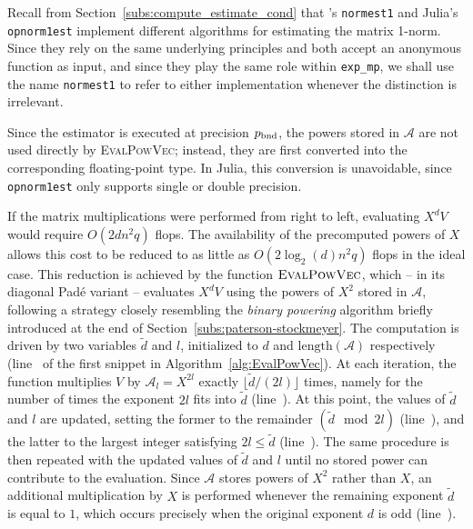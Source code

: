 \begin{oss*}
	Recall from Section~\ref{subs:compute_estimate_cond} that \matlab{}'s \texttt{normest1} and Julia's \texttt{opnorm1est} implement different algorithms for estimating the matrix 1-norm. Since they rely on the same underlying principles and both accept an anonymous function as input, and since they play the same role within \texttt{exp\_mp}, we shall use the name \texttt{normest1} to refer to either implementation whenever the distinction is irrelevant.
	
	Since the estimator is executed at precision $p_{\textup{bnd}}$, the powers stored in $\mathcal{A}$ are not used directly by \textsc{EvalPowVec}; instead, they are first converted into the corresponding floating-point type. In Julia, this conversion is unavoidable, since \texttt{opnorm1est} only supports single or double precision. 
\end{oss*}

If the matrix multiplications were performed from right to left, evaluating $X^{d}V$ would require $O(2dn^{2}q)$ flops. The availability of the precomputed powers of $X$ allows this cost to be reduced to as little as $O(2\log_2(d)n^{2}q)$ flops in the ideal case. This reduction is achieved by the function $\textsc{EvalPowVec}$, which -- in its diagonal Padé variant -- evaluates $X^{d}V$ using the powers of $X^2$ stored in $\mathcal{A}$, following a strategy closely resembling the \emph{binary powering} algorithm briefly introduced at the end of Section~\ref{subs:paterson-stockmeyer}.
The computation is driven by two variables $\tilde{d}$ and $l$, initialized to $d$ and $\text{length}(\mathcal{A})$ respectively (line~ of the first snippet in Algorithm~\ref{alg:EvalPowVec}). At each iteration, the function multiplies $V$ by $\mathcal{A}_{l}=X^{2l}$ exactly $\lfloor\tilde{d}/(2l)\rfloor$ times, namely for the number of times the exponent $2l$ fits into $\tilde{d}$ (line~). At this point, the values of $\tilde{d}$ and $l$ are updated, setting the former to the remainder $(\tilde{d}\mod{2l})$ (line~), and the latter to the largest integer satisfying $2l\le\tilde{d}$ (line~). The same procedure is then repeated with the updated values of $\tilde{d}$ and $l$ until no stored power can contribute to the evaluation. 
Since $\mathcal{A}$ stores powers of $X^2$ rather than $X$, an additional multiplication by $X$ is performed whenever the remaining exponent $\tilde{d}$ is equal to $1$, which occurs precisely when the original exponent $d$ is odd (line~).


